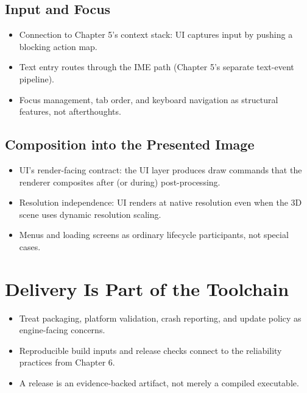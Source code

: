 \documentclass[
  11pt,
  letterpaper,
  DIV=11,
  numbers=noendperiod,
  twoside,
  open=right]{scrreprt}
\providecommand{\tightlist}{%
  \setlength{\itemsep}{0pt}\setlength{\parskip}{0pt}}
\begin{document}
\subsection{Input and Focus}\label{input-and-focus}

\begin{itemize}
\tightlist
\item
  Connection to Chapter 5's context stack: UI captures input by pushing
  a blocking action map.
\item
  Text entry routes through the IME path (Chapter 5's separate
  text-event pipeline).
\item
  Focus management, tab order, and keyboard navigation as structural
  features, not afterthoughts.
\end{itemize}

\subsection{Composition into the Presented
Image}\label{composition-into-the-presented-image}

\begin{itemize}
\tightlist
\item
  UI's render-facing contract: the UI layer produces draw commands that
  the renderer composites after (or during) post-processing.
\item
  Resolution independence: UI renders at native resolution even when the
  3D scene uses dynamic resolution scaling.
\item
  Menus and loading screens as ordinary lifecycle participants, not
  special cases.
\end{itemize}

\section{Delivery Is Part of the
Toolchain}\label{delivery-is-part-of-the-toolchain}

\begin{itemize}
\tightlist
\item
  Treat packaging, platform validation, crash reporting, and update
  policy as engine-facing concerns.
\item
  Reproducible build inputs and release checks connect to the
  reliability practices from Chapter 6.
\item
  A release is an evidence-backed artifact, not merely a compiled
  executable.
\end{itemize}
\end{document}
